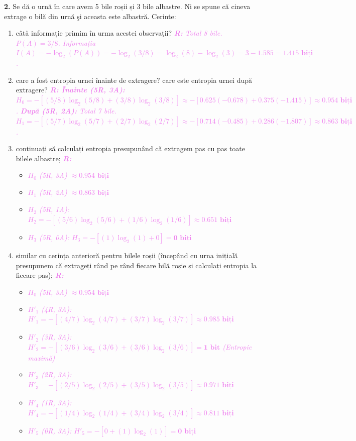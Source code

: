 \documentclass[a4paper]{article}
\newcommand{\hl}[1]{\textcolor{violet}{\textit{#1}}}
\begin{document}
\textbf{2.} Se dă o urnă în care avem 5 bile roșii și 3 bile albastre.
Ni se spune că cineva extrage o bilă din
urnă şi aceasta este albastră. Cerinte:
\begin{enumerate}[label=(\alph*)]
    \item câtă informație primim în urma acestei observaţii?
    \hl{\textbf{R:} Total 8 bile. $P(A) = 3/8$. Informația $I(A) = -\log_2(P(A)) = -\log_2(3/8) = \log_2(8) - \log_2(3) = 3 - 1.585 = \mathbf{1.415 \text{ biți}}$.}
    \item care a fost entropia urnei înainte de extragere? care este entropia urnei după extragere?
    \hl{\textbf{R: Înainte (5R, 3A):} $H_0 = - [ (5/8)\log_2(5/8) + (3/8)\log_2(3/8) ] \approx -[0.625(-0.678) + 0.375(-1.415)] \approx \mathbf{0.954 \text{ biți}}$.}
    \hl{\textbf{După (5R, 2A):} Total 7 bile. $H_1 = - [ (5/7)\log_2(5/7) + (2/7)\log_2(2/7) ] \approx -[0.714(-0.485) + 0.286(-1.807)] \approx \mathbf{0.863 \text{ biți}}$.}
    \item continuați să calculați entropia presupunând că extragem pas cu pas toate bilele albastre;
    \hl{\textbf{R:}}
    \begin{itemize}
        \item \hl{$H_0$ (5R, 3A) $\approx \mathbf{0.954 \text{ biți}}$}
        \item \hl{$H_1$ (5R, 2A) $\approx \mathbf{0.863 \text{ biți}}$}
        \item \hl{$H_2$ (5R, 1A): $H_2 = - [ (5/6)\log_2(5/6) + (1/6)\log_2(1/6) ] \approx \mathbf{0.651 \text{ biți}}$}
        \item \hl{$H_3$ (5R, 0A): $H_3 = - [ (1)\log_2(1) + 0 ] = \mathbf{0 \text{ biți}}$}
    \end{itemize}
    \item similar cu cerința anterioră pentru bilele roșii (începând cu urna inițială presupunem că
extrageți rând pe rând fiecare bilă roșie și calculați entropia la fiecare pas);
    \hl{\textbf{R:}}
    \begin{itemize}
        \item \hl{$H_0$ (5R, 3A) $\approx \mathbf{0.954 \text{ biți}}$}
        \item \hl{$H'_1$ (4R, 3A): $H'_1 = - [ (4/7)\log_2(4/7) + (3/7)\log_2(3/7) ] \approx \mathbf{0.985 \text{ biți}}$}
        \item \hl{$H'_2$ (3R, 3A): $H'_2 = - [ (3/6)\log_2(3/6) + (3/6)\log_2(3/6) ] = \mathbf{1 \text{ bit}}$ (Entropie maximă)}
        \item \hl{$H'_3$ (2R, 3A): $H'_3 = - [ (2/5)\log_2(2/5) + (3/5)\log_2(3/5) ] \approx \mathbf{0.971 \text{ biți}}$}
        \item \hl{$H'_4$ (1R, 3A): $H'_4 = - [ (1/4)\log_2(1/4) + (3/4)\log_2(3/4) ] \approx \mathbf{0.811 \text{ biți}}$}
        \item \hl{$H'_5$ (0R, 3A): $H'_5 = - [ 0 + (1)\log_2(1) ] = \mathbf{0 \text{ biți}}$}
    \end{itemize}
\end{enumerate}
\end{document}
